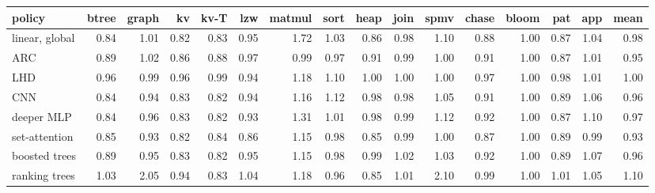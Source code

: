 \begin{tabular}{lrrrrrrrrrrrrrrr}
\toprule
policy & btree & graph & kv & kv-T & lzw & matmul & sort & heap & join & spmv & chase & bloom & pat & app & mean \\
\midrule
linear, global & 0.84 & 1.01 & 0.82 & 0.83 & 0.95 & 1.72 & 1.03 & 0.86 & 0.98 & 1.10 & 0.88 & 1.00 & 0.87 & 1.04 & 0.98 \\
ARC & 0.89 & 1.02 & 0.86 & 0.88 & 0.97 & 0.99 & 0.97 & 0.91 & 0.99 & 1.00 & 0.91 & 1.00 & 0.87 & 1.01 & 0.95 \\
LHD & 0.96 & 0.99 & 0.96 & 0.99 & 0.94 & 1.18 & 1.10 & 1.00 & 1.00 & 1.00 & 0.97 & 1.00 & 0.98 & 1.01 & 1.00 \\
CNN & 0.84 & 0.94 & 0.83 & 0.82 & 0.94 & 1.16 & 1.12 & 0.98 & 0.98 & 1.05 & 0.91 & 1.00 & 0.89 & 1.06 & 0.96 \\
deeper MLP & 0.84 & 0.96 & 0.83 & 0.82 & 0.93 & 1.31 & 1.01 & 0.98 & 0.99 & 1.12 & 0.92 & 1.00 & 0.87 & 1.10 & 0.97 \\
set-attention & 0.85 & 0.93 & 0.82 & 0.84 & 0.86 & 1.15 & 0.98 & 0.85 & 0.99 & 1.00 & 0.87 & 1.00 & 0.89 & 0.99 & 0.93 \\
boosted trees & 0.89 & 0.95 & 0.83 & 0.82 & 0.95 & 1.15 & 0.98 & 0.99 & 1.02 & 1.03 & 0.92 & 1.00 & 0.89 & 1.07 & 0.96 \\
ranking trees & 1.03 & 2.05 & 0.94 & 0.83 & 1.04 & 1.18 & 0.96 & 0.85 & 1.01 & 2.10 & 0.99 & 1.00 & 1.01 & 1.05 & 1.10 \\
\bottomrule
\end{tabular}
